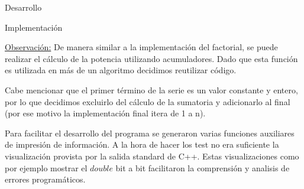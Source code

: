 \begin{section}{Desarrollo}
\begin{subsection}{Implementación}
\begin{itemize}
		\underline{Observación:} De manera similar a la implementación del factorial, se puede realizar el cálculo de la potencia utilizando acumuladores. Dado que esta función es utilizada en más de un algoritmo decidimos reutilizar código.
		
		Cabe mencionar que el primer término de la serie es un valor constante y entero, por lo que decidimos excluirlo del cálculo de la sumatoria y adicionarlo al final (por ese motivo la implementación final itera de 1 a n).
		\end{itemize}
		
		Para facilitar el desarrollo del programa se generaron varias funciones auxiliares de impresión de información. A la hora de hacer los test no era suficiente la visualización provista por la salida standard de C++. Estas visualizaciones como por ejemplo mostrar el $double$ bit a bit facilitaron la comprensión y analisis de errores programáticos.
		
	\end{subsection}
\end{section}
